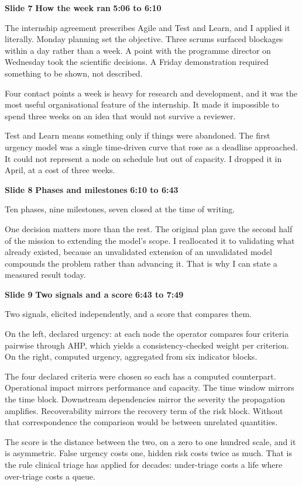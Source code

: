 \documentclass[a4paper,12pt]{article}
\newcommand{\SlideHeading}[3]{%
  \needspace{4\baselineskip}%
  \vspace{10pt}%
  \noindent\colorbox{altenBlueBg}{%
    \parbox{\dimexpr\linewidth-2\fboxsep}{%
      \vspace{3pt}%
      \textbf{\large\color{altenNavy}#1}\quad
      \textbf{\large\color{altenAzureDark}#2}%
      \hfill\textbf{\color{altenAzure}#3}%
      \vspace{3pt}}}%
  \vspace{5pt}\par}
\begin{document}
\SlideHeading{Slide 7}{How the week ran}{5:06 to 6:10}
The internship agreement prescribes Agile and Test and Learn, and I applied it literally. Monday planning set the objective. Three scrums surfaced blockages within a day rather than a week. A point with the programme director on Wednesday took the scientific decisions. A Friday demonstration required something to be shown, not described.

Four contact points a week is heavy for research and development, and it was the most useful organisational feature of the internship. It made it impossible to spend three weeks on an idea that would not survive a reviewer.

Test and Learn means something only if things were abandoned. The first urgency model was a single time-driven curve that rose as a deadline approached. It could not represent a node on schedule but out of capacity. I dropped it in April, at a cost of three weeks.

\SlideHeading{Slide 8}{Phases and milestones}{6:10 to 6:43}
Ten phases, nine milestones, seven closed at the time of writing.

One decision matters more than the rest. The original plan gave the second half of the mission to extending the model's scope. I reallocated it to validating what already existed, because an unvalidated extension of an unvalidated model compounds the problem rather than advancing it. That is why I can state a measured result today.

\SlideHeading{Slide 9}{Two signals and a score}{6:43 to 7:49}
Two signals, elicited independently, and a score that compares them.

On the left, declared urgency: at each node the operator compares four criteria pairwise through AHP, which yields a consistency-checked weight per criterion. On the right, computed urgency, aggregated from six indicator blocks.

The four declared criteria were chosen so each has a computed counterpart. Operational impact mirrors performance and capacity. The time window mirrors the time block. Downstream dependencies mirror the severity the propagation amplifies. Recoverability mirrors the recovery term of the risk block. Without that correspondence the comparison would be between unrelated quantities.

The score is the distance between the two, on a zero to one hundred scale, and it is asymmetric. False urgency costs one, hidden risk costs twice as much. That is the rule clinical triage has applied for decades: under-triage costs a life where over-triage costs a queue.
\end{document}
